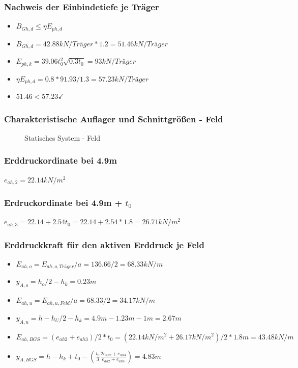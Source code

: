 \documentclass[11pt,fleqn,a4paper,halfparskip]{article}
\begin{document}
\subsubsection*{Nachweis der Einbindetiefe je Träger}
\begin{itemize}
\item[] $B_{Gh,d} \le \eta E_{ph,d}$
\item[] $B_{Gh,d} = 42.88kN/Träger * 1.2 = 51.46kN/Träger$
\item[] $E_{ph,k} =  39.06t_0^2\sqrt{0.3t_0} = 93kN/Träger $
\item[] $\eta E_{ph,d} = 0.8* 91.93/1.3 = 57.23kN/Träger$
\item[] $51.46 < 57.23 \checkmark$
\end{itemize}
\newpage
\subsubsection{Charakteristische Auflager und Schnittgrößen - Feld}
\begin{figure}[h]
\vspace{8cm}
\caption[Statisches System 2 Aufgabe 2]{Statisches System - Feld \cite{me}}
\end{figure}
\subsubsection*{Erddruckordinate bei 4.9m}
$e_{ah,2} = 22.14kN/m^2$
\subsubsection*{Erdruckordinate bei 4.9m + $t_0$}
$e_{ah,3} = 22.14 + 2.54t_0 = 22.14 + 2.54*1.8 = 26.71kN/m^2$
\subsubsection*{Erddruckkraft für den aktiven Erddruck je Feld}
\begin{itemize}
\item[] $E_{ah,o} = E_{ah,o,Träger}/a = 136.66/2 = 68.33kN/m$
\item[] $y_{A,o} = h_o/2 - h_k = 0.23m$
\item[] $E_{ah,u} = E_{ah,u,Feld}/a = 68.33 / 2 = 34.17kN/m$
\item[] $y_{A,u} = h - h_U/2 -h_k = 4.9m - 1.23m - 1m = 2.67m$
\item[] $E_{ah,BGS} = (e_{ah2} + e_{ah3})/2*t_0 = (22.14kN/m^2 + 26.17kN/m^2)/2*1.8m = 43.48kN/m$
\item[] $y_{A,BGS} = h - h_k + t_0 - \left( \frac{t_0}{3}\frac{2e_{ah2}+e_{ah3}}{e_{ah2}+e_{ah3}} \right) = 4.83m$
\end{itemize}
\end{document}
